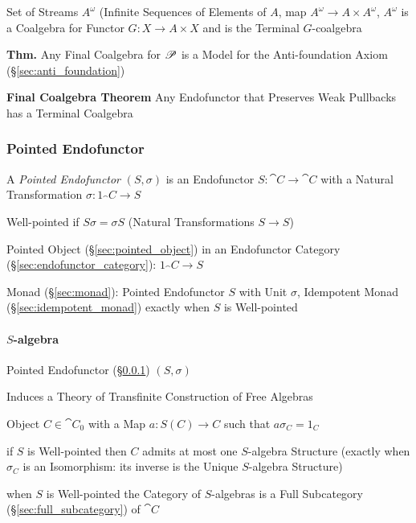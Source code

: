 Set of Streams $A^\omega$ (Infinite Sequences of Elements of $A$, map
$A^\omega \rightarrow A \times A^\omega$, $A^\omega$ is a Coalgebra
for Functor $G : X \rightarrow A \times X$ and is the Terminal
$G$-coalgebra

\textbf{Thm.} Any Final Coalgebra for $\mathscr{P}$ is a Model for the
Anti-foundation Axiom (\S\ref{sec:anti_foundation}) \cite{aczel88}

\textbf{Final Coalgebra Theorem} Any Endofunctor that Preserves Weak
Pullbacks has a Terminal Coalgebra \cite{aczel88}



\subsubsection{Pointed Endofunctor}\label{sec:pointed_endofunctor}

A \emph{Pointed Endofunctor} $(S,\sigma)$ is an Endofunctor $S :
\cat{C} \rightarrow \cat{C}$ with a Natural Transformation $\sigma :
1_\cat{C} \rightarrow S$

Well-pointed if $S \sigma = \sigma S$ (Natural Transformations $S
\rightarrow S$)

Pointed Object (\S\ref{sec:pointed_object}) in an Endofunctor Category
(\S\ref{sec:endofunctor_category}): $1_\cat{C} \rightarrow S$

Monad (\S\ref{sec:monad}): Pointed Endofunctor $S$ with Unit $\sigma$,
Idempotent Monad (\S\ref{sec:idempotent_monad}) exactly when $S$ is
Well-pointed



\paragraph{$S$-algebra}\label{sec:s_algebra}\hfill

Pointed Endofunctor (\S\ref{sec:pointed_endofunctor}) $(S, \sigma)$

Induces a Theory of Transfinite Construction of Free Algebras

Object $C \in \cat{C}_0$ with a Map $a : S(C) \rightarrow C$ such that
$a \sigma_C = 1_C$

if $S$ is Well-pointed then $C$ admits at most one $S$-algebra
Structure (exactly when $\sigma_C$ is an Isomorphism: its inverse is
the Unique $S$-algebra Structure)

when $S$ is Well-pointed the Category of $S$-algebras is a Full
Subcategory (\S\ref{sec:full_subcategory}) of $\cat{C}$



